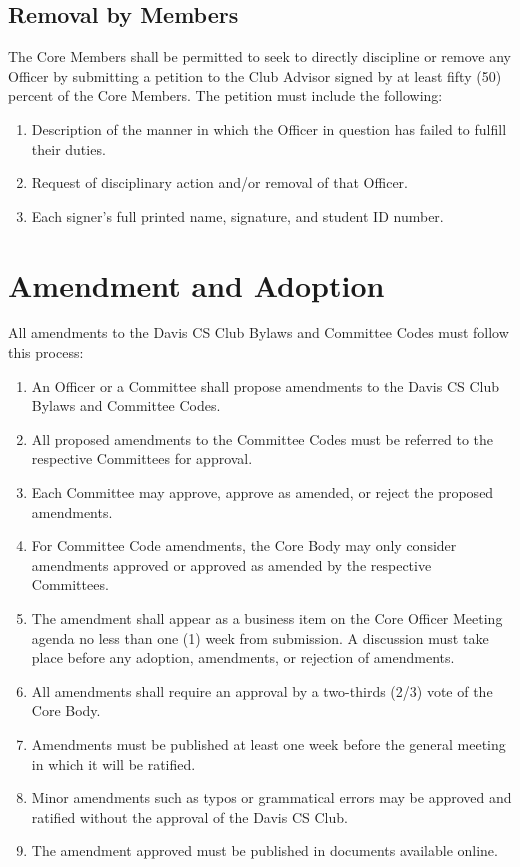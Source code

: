 \documentclass{article}
\newenvironment{li}{
\begin{enumerate}
  \setlength{\itemsep}{1pt}
  \setlength{\parskip}{0pt}
  \setlength{\parsep}{0pt}
}{\end{enumerate}}
\begin{document}
\subsection{Removal by Members}
The Core Members shall be permitted to seek to directly discipline or remove any Officer by submitting a petition to the Club Advisor signed by at least fifty (50) percent of the Core Members. The petition must include the following:
\begin{li}
\item Description of the manner in which the Officer in question has failed to fulfill their duties.
\item Request of disciplinary action and/or removal of that Officer.
\item Each signer's full printed name, signature, and student ID number.
\end{li}




\section{Amendment and Adoption}
All amendments to the Davis CS Club Bylaws and Committee Codes must follow this process:
\begin{li}
\item An Officer or a Committee shall propose amendments to the Davis CS Club Bylaws and Committee Codes.
\item All proposed amendments to the Committee Codes must be referred to the respective Committees for approval.
\item Each Committee may approve, approve as amended, or reject the proposed amendments.
\item For Committee Code amendments, the Core Body may only consider amendments approved or approved as amended by the respective Committees.
\item The amendment shall appear as a business item on the Core Officer Meeting agenda no less than one (1) week from submission. A discussion must take place before any adoption, amendments, or rejection of amendments.
\item All amendments shall require an approval by a two-thirds (2/3) vote of the Core Body.
\item Amendments must be published at least one week before the general meeting in which it will be ratified.
\item Minor amendments such as typos or grammatical errors may be approved and ratified without the approval of the Davis CS Club.
\item The amendment approved must be published in documents available online.
\end{li}
\end{document}
